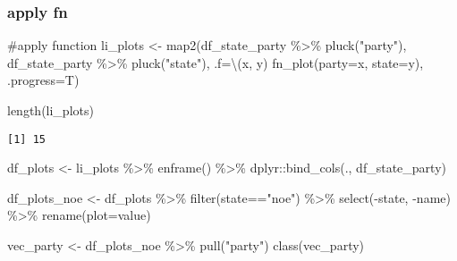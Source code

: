 \documentclass[
  letterpaper,
  DIV=11,
  numbers=noendperiod,
  oneside]{scrartcl}
\newenvironment{Shaded}{\begin{snugshade}}{\end{snugshade}}
\newcommand{\AttributeTok}[1]{\textcolor[rgb]{0.40,0.45,0.13}{#1}}
\newcommand{\CommentTok}[1]{\textcolor[rgb]{0.37,0.37,0.37}{#1}}
\newcommand{\FunctionTok}[1]{\textcolor[rgb]{0.28,0.35,0.67}{#1}}
\newcommand{\NormalTok}[1]{\textcolor[rgb]{0.00,0.23,0.31}{#1}}
\newcommand{\OtherTok}[1]{\textcolor[rgb]{0.00,0.23,0.31}{#1}}
\newcommand{\SpecialCharTok}[1]{\textcolor[rgb]{0.37,0.37,0.37}{#1}}
\newcommand{\StringTok}[1]{\textcolor[rgb]{0.13,0.47,0.30}{#1}}
\begin{document}
\hypertarget{apply-fn}{%
\subsubsection{apply fn}\label{apply-fn}}

\begin{Shaded}
\begin{Highlighting}[]
\CommentTok{\#apply function}
\NormalTok{li\_plots }\OtherTok{\textless{}{-}}  \FunctionTok{map2}\NormalTok{(df\_state\_party }\SpecialCharTok{\%\textgreater{}\%} \FunctionTok{pluck}\NormalTok{(}\StringTok{"party"}\NormalTok{),}
\NormalTok{       df\_state\_party }\SpecialCharTok{\%\textgreater{}\%} \FunctionTok{pluck}\NormalTok{(}\StringTok{"state"}\NormalTok{), }
       \AttributeTok{.f=}\NormalTok{\textbackslash{}(x, y) }\FunctionTok{fn\_plot}\NormalTok{(}\AttributeTok{party=}\NormalTok{x, }\AttributeTok{state=}\NormalTok{y), }
       \AttributeTok{.progress=}\NormalTok{T)}
\end{Highlighting}
\end{Shaded}

\begin{Shaded}
\begin{Highlighting}[]
\FunctionTok{length}\NormalTok{(li\_plots)}
\end{Highlighting}
\end{Shaded}

\begin{verbatim}
[1] 15
\end{verbatim}

\begin{Shaded}
\begin{Highlighting}[]
\NormalTok{df\_plots }\OtherTok{\textless{}{-}}\NormalTok{ li\_plots }\SpecialCharTok{\%\textgreater{}\%} \FunctionTok{enframe}\NormalTok{() }\SpecialCharTok{\%\textgreater{}\%}
\NormalTok{dplyr}\SpecialCharTok{::}\FunctionTok{bind\_cols}\NormalTok{(., df\_state\_party)}

\NormalTok{df\_plots\_noe }\OtherTok{\textless{}{-}}\NormalTok{ df\_plots }\SpecialCharTok{\%\textgreater{}\%}
\FunctionTok{filter}\NormalTok{(state}\SpecialCharTok{==}\StringTok{"noe"}\NormalTok{) }\SpecialCharTok{\%\textgreater{}\%}
\FunctionTok{select}\NormalTok{(}\SpecialCharTok{{-}}\NormalTok{state, }\SpecialCharTok{{-}}\NormalTok{name) }\SpecialCharTok{\%\textgreater{}\%}
\FunctionTok{rename}\NormalTok{(}\AttributeTok{plot=}\NormalTok{value)}

\NormalTok{vec\_party }\OtherTok{\textless{}{-}}\NormalTok{ df\_plots\_noe }\SpecialCharTok{\%\textgreater{}\%} \FunctionTok{pull}\NormalTok{(}\StringTok{"party"}\NormalTok{)}
\FunctionTok{class}\NormalTok{(vec\_party)}
\end{Highlighting}
\end{Shaded}
\end{document}
